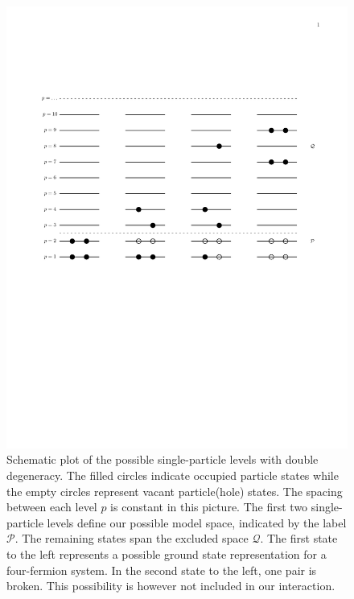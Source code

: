 \documentclass[%
twoside,                 %
final,                   %
10pt]{article}
\begin{document}
\begin{figure}[t]
  \centerline{\includegraphics[width=0.7\linewidth]{fig-proj/simplemodel.pdf}}
  \caption{
  Schematic plot of the possible single-particle levels with double degeneracy.  The filled circles indicate occupied particle  states while the empty circles represent vacant particle(hole)  states.  The spacing between each level $p$ is constant in this picture.  The first two single-particle levels define our possible  model space, indicated by the label $\mathcal{P}$.  The remaining  states span the excluded space $\mathcal{Q}$.  The first state to  the left represents a possible ground state representation for a  four-fermion system. In the second state to the left, one pair is   broken. This possibility is however not included in our  interaction. \label{fig:schematic}
  }
\end{figure}
\end{document}
